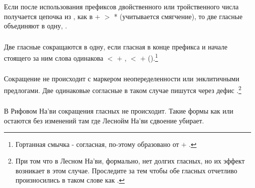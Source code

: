 \subsubsection{} Если после использования префиксов двойственного или тройственного числа получается цепочка из , как в  $+$  $>$ * (учитывается смягчение), то две гласные объединяют в одну, .
\label{l-and-s:phonotactics:nsc} 

\subsubsection{} Две гласные сокращаются в одну, если гласная в конце префикса и начале стоящего за ним слова одинакова  $<$
 $+$ ,  $<$  $+$ 
().\footnote{Гортанная смычка - согласная, по-этому  образовано от  $+$ .}
\label{l-and-s:phonotactics:precontract}

\subsubsection{} Сокращение не происходит с маркером неопеределенности  или энклитичными предлогами. Две одинаковые согласные в таком случае пишутся через дефис 
  .\footnote{При том что в Лесном На'ви, формально, нет долгих гласных, но их эффект возникает в этом случае. Проследите за тем чтобы обе гласных  отчетливо произносились в таком слове как .}

\subsubsection{} В Рифовом На'ви сокращения гласных не происходит.
Такие формы как  или  остаются без изменений там где Леснойм На'ви сдвоение убирает.
\label{rn:no-contract}

